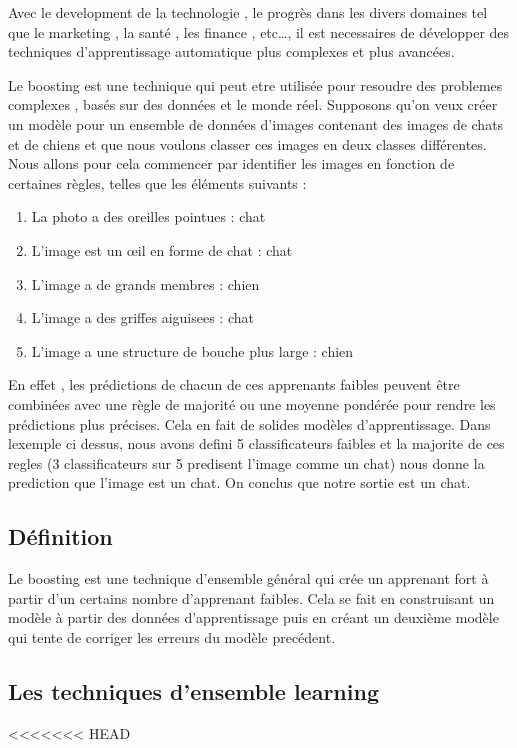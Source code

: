 \documentclass[french,a4paper,12pt]{article}
\begin{document}
\quad Avec le development de la technologie , le progrès dans les divers domaines tel que le marketing , la santé , les finance , etc…, il est necessaires de développer des techniques d'apprentissage automatique plus complexes et plus avancées\citep{educa}. 

\quad Le boosting est une technique qui peut etre utilisée pour resoudre des problemes complexes , basés sur des données et le monde réel.
Supposons qu'on veux   créer un modèle pour un ensemble de données d'images contenant des images de chats et de chiens et que nous voulons classer ces images en deux classes différentes. Nous allons pour cela  commencer par identifier les images en fonction de certaines règles, telles que les éléments suivants : 
\begin{enumerate} 
    \item La photo a des oreilles pointues : chat
    \item L'image est un œil en forme de chat : chat
    \item L'image a de grands membres : chien
    \item L'image a des griffes aiguisees : chat
     \item L'image a une structure de bouche plus large : chien
\end{enumerate}  

\quad En effet , les prédictions de chacun de ces apprenants faibles peuvent être combinées avec une règle de majorité ou une moyenne pondérée pour rendre les prédictions plus précises. Cela en fait de solides modèles d'apprentissage.
Dans lexemple ci dessus, nous avons defini 5 classificateurs faibles et  la majorite de ces regles (3 classificateurs sur 5 predisent l'image comme un chat) nous donne la prediction que l’image est un chat. On conclus que notre sortie est un chat. 

\subsection{Définition}

 \quad Le boosting est une technique d’ensemble général qui crée un apprenant fort à partir d’un certains nombre d’apprenant faibles. Cela se fait en construisant un modèle à partir des données d’apprentissage puis en créant un deuxième modèle qui tente de corriger les erreurs du modèle precédent. 

\subsection{ Les techniques d'ensemble learning}
<<<<<<< HEAD
\end{document}
